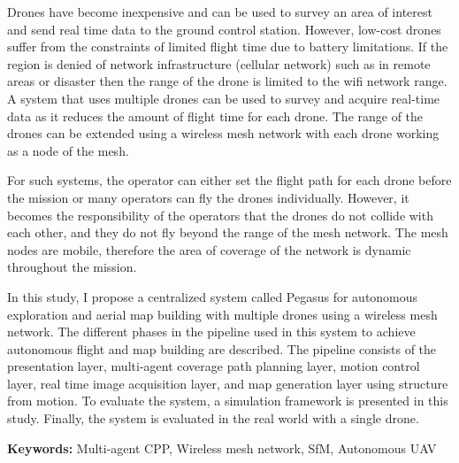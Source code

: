 
\setlength{\parindent}{0pt}
\setlength{\parskip}{1em}
\setlength{\baselineskip}{1.5em}

\begin{center}
  \fontsize{14}{17}
\end{center}
\vspace{2em}

Drones have become inexpensive and can be used to survey an area of interest and send real time data to the ground control station. However, low-cost drones suffer from the constraints of limited flight time due to battery limitations. If the region is denied of network infrastructure (cellular network) such as in remote areas or disaster then the range of the drone is limited to the wifi network range. A system that uses multiple drones can be used to survey and acquire real-time data as it reduces the amount of flight time for each drone. The range of the drones can be extended using a wireless mesh network with each drone working as a node of the mesh. 

For such systems, the operator can either set the flight path for each drone before the mission or many operators can fly the drones individually.  However, it becomes the responsibility of the operators that the drones do not collide with each other, and they do not fly beyond the range of the mesh network. The mesh nodes are mobile, therefore the area of coverage of the network is dynamic throughout the mission.

In this study, I propose a centralized system called Pegasus for autonomous exploration and aerial map building with multiple drones using a wireless mesh network. The different phases in the pipeline used in this system to achieve autonomous flight and map building are described.  The pipeline consists of the presentation layer, multi-agent coverage path planning layer, motion control layer, real time image acquisition layer, and map generation layer using structure from motion. To evaluate the system, a simulation framework is presented in this study. Finally, the system is evaluated in the real world with a single drone. 


\textbf{Keywords:} Multi-agent CPP, Wireless mesh network, SfM, Autonomous UAV
